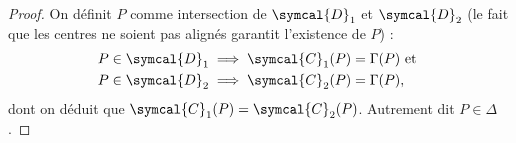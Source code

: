 
\figurecentrerad

\begin{proof}
On définit $P$ comme intersection de $\symcal{D}_1$ et $\symcal{D}_2$ (le fait que les centres ne soient pas alignés garantit l'existence de $P$) :
\begin{align*}
P\in \symcal{D}_1&\implies \symcal{C}_1(P)=\Gamma(P)\text{ et }\\
P\in \symcal{D}_2&\implies \symcal{C}_2(P)=\Gamma(P),
\end{align*}
dont on déduit que $\symcal{C}_1(P)=\symcal{C}_2(P)$. Autrement dit $P\in \Delta$.
\end{proof}
%

\endinput